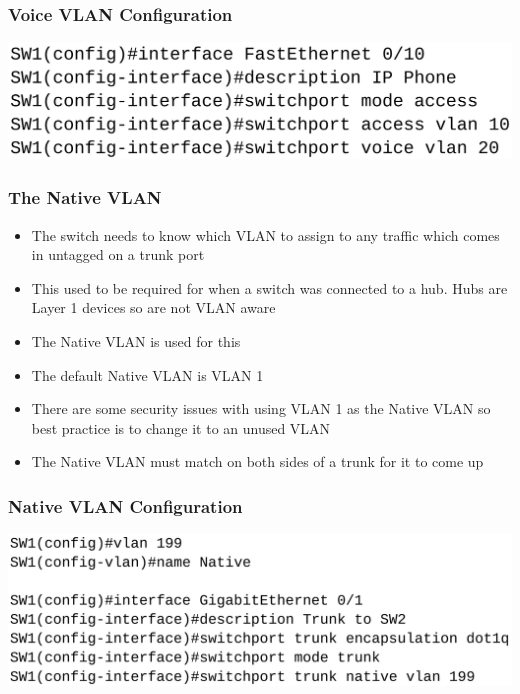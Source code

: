 \documentclass[pdflatex,compress,mathserif]{beamer}
\begin{document}
\begin{frame}
	\frametitle{Voice VLAN Configuration}
	\begin{center}
		\includegraphics[width=\linewidth]{img/img27}
	\end{center}
\end{frame}

\begin{frame}
	\frametitle{The Native VLAN}
	\begin{itemize}
		\item The switch needs to know which VLAN to assign to any traffic which
comes in untagged on a trunk port
		\item This used to be required for when a switch was connected to a hub.
Hubs are Layer 1 devices so are not VLAN aware
		\item The Native VLAN is used for this
		\item The default Native VLAN is VLAN 1
		\item There are some security issues with using VLAN 1 as the Native VLAN so
best practice is to change it to an unused VLAN
		\item The Native VLAN must match on both sides of a trunk for it to come up
	\end{itemize}
\end{frame}

\begin{frame}
	\frametitle{Native VLAN Configuration}
	\begin{center}
		\includegraphics[width=\linewidth]{img/img28}
	\end{center}
\end{frame}
\end{document}

